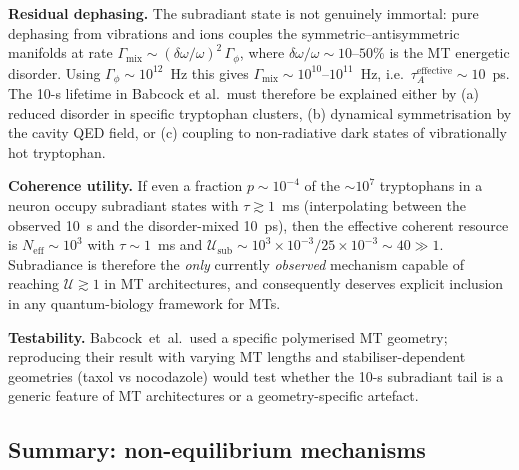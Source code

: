 \documentclass[twocolumn,10pt]{article}
\begin{document}
\textbf{Residual dephasing.} The subradiant state is not genuinely
immortal: pure dephasing from vibrations and ions couples the
symmetric--antisymmetric manifolds at rate
$\Gamma_{\text{mix}}\sim (\delta\omega/\omega)^2\,\Gamma_\phi$, where
$\delta\omega/\omega\sim 10\text{--}50\%$ is the MT energetic disorder.
Using $\Gamma_\phi\sim 10^{12}$~Hz this gives $\Gamma_{\text{mix}}
\sim 10^{10}\text{--}10^{11}$~Hz, i.e.\ $\tau_A^{\text{effective}}
\sim 10$~ps. The 10-s lifetime in Babcock et al.\ must therefore be
explained either by (a) reduced disorder in specific tryptophan clusters,
(b) dynamical symmetrisation by the cavity QED field, or (c) coupling to
non-radiative dark states of vibrationally hot tryptophan.

\textbf{Coherence utility.} If even a fraction $p\sim 10^{-4}$ of the
$\sim 10^7$ tryptophans in a neuron occupy subradiant states with
$\tau\gtrsim 1$~ms (interpolating between the observed 10~s and the
disorder-mixed 10~ps), then the effective coherent resource is
$N_{\text{eff}}\sim 10^3$ with $\tau\sim 1$~ms and
$\mathcal{U}_{\text{sub}}\sim 10^3\times 10^{-3}/25\times 10^{-3}
\sim 40\gg 1$. Subradiance is therefore the \emph{only} currently
\emph{observed} mechanism capable of reaching $\mathcal{U}\gtrsim 1$ in
MT architectures, and consequently deserves explicit inclusion in any
quantum-biology framework for MTs.

\textbf{Testability.} Babcock~et~al.\ used a specific polymerised MT
geometry; reproducing their result with varying MT lengths and
stabiliser-dependent geometries (taxol vs nocodazole) would test whether
the 10-s subradiant tail is a generic feature of MT architectures or a
geometry-specific artefact.



\subsection{Summary: non-equilibrium mechanisms}
\end{document}
